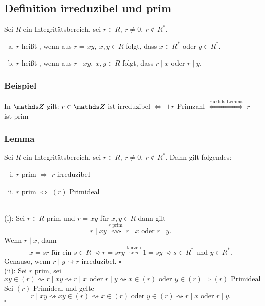 \subsection{Definition irreduzibel und prim}
\label{sub:def_irreduzibel_prim}
Sei $R$ ein Integritätsbereich, sei $r\in R,~r\neq 0,~r\notin R^*$.
\begin{enumerate}[(a)]
	\item $r$ heißt , wenn aus $r=xy,~x,y\in R$ folgt, dass $x\in R^*$ oder $y\in R^*$.
	\item $r$ heißt , wenn aus $r\mid xy,~x,y\in R$ folgt, dass $r\mid x$ oder $r\mid y$.
\end{enumerate}

\subsubsection*{Beispiel}
In $\Z$ gilt: $r\in \Z$ ist irreduzibel $\Leftrightarrow$ $\pm r$ Primzahl $\stackrel{\text{Euklids Lemma}}{\Leftrightarrow}$ $r$ ist prim

\subsubsection*{Lemma}
Sei $R$ ein Integritätsbereich, sei $r\in R,~r\neq 0,~r\notin R^*$.
Dann gilt folgendes:
\begin{enumerate}[(i)]
	\item $r$ prim $\Rightarrow$ $r$ irreduzibel
	\item $r$ prim $\Leftrightarrow$ $(r)$ Primideal
\end{enumerate}

\\
(i): Sei $r\in R$ prim und $r=xy$ für $x,y\in R$ dann gilt
\[
r\mid xy\stackrel{r\text{ prim }}{\rightsquigarrow} r\mid x \text{ oder } r\mid y.
\]
Wenn $r\mid x$, dann 
\[
x=sr \text{ für ein } s\in R\rightsquigarrow r=sry\stackrel{\text{kürzen}}{\rightsquigarrow} 1=sy\rightsquigarrow s\in R^* \text{ und } y\in R^*.
\]
Genauso, wenn $r\mid y\rightsquigarrow r$ irreduzibel.
\hfill $\square$\\

(ii): Sei $r$ prim, sei 
\[
xy\in (r)\rightsquigarrow r\mid xy\rightsquigarrow r\mid x \text{ oder } r\mid y\rightsquigarrow x\in (r) \text{ oder } y\in (r)\Rightarrow (r) \text{ Primideal}
\]
Sei $(r)$ Primideal und gelte 
\[
r\mid xy\rightsquigarrow xy\in (r)\rightsquigarrow x\in (r) \text{ oder } y\in (r)\rightsquigarrow r\mid x \text{ oder } r\mid y.
\]
\hfill $\square$

